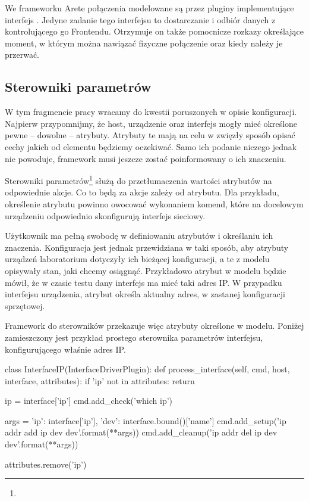 \documentclass[00-praca-magisterska.tex]{subfiles}
\begin{document}
We frameworku Arete połączenia modelowane są przez pluginy implementujące
interfejs . Jedyne zadanie tego interfejsu to
dostarczanie i odbiór danych z kontrolującego go Frontendu. Otrzymuje on także
pomocnicze rozkazy określające moment, w którym można nawiązać fizyczne
połączenie oraz kiedy należy je przerwać.


\subsection{Sterowniki parametrów}

W tym fragmencie pracy wracamy do kwestii poruszonych w opisie konfiguracji.
Najpierw przypomnijmy, że host, urządzenie oraz interfejs mogły mieć określone
pewne -- dowolne -- atrybuty. Atrybuty te mają na celu w zwięzły sposób opisać
cechy jakich od elementu będziemy oczekiwać. Samo ich podanie niczego jednak nie
powoduje, framework musi jeszcze zostać poinformowany o ich znaczeniu.

Sterowniki parametrów\footnote{} służą do przetłumaczenia
wartości atrybutów na odpowiednie akcje. Co to będą za akcje zależy od atrybutu.
Dla przykładu, określenie atrybutu  powinno owocować wykonaniem komend,
które na docelowym urządzeniu odpowiednio skonfigurują interfejs sieciowy.

Użytkownik ma pełną swobodę w definiowaniu atrybutów i określaniu ich
znaczenia. Konfiguracja jest jednak przewidziana w taki sposób, aby atrybuty
urządzeń laboratorium dotyczyły ich bieżącej konfiguracji, a te z modelu
opisywały stan, jaki chcemy osiągnąć. Przykładowo atrybut  w modelu
będzie mówił, że w czasie testu dany interfejs ma mieć taki adres IP. W
przypadku interfejsu urządzenia, atrybut  określa aktualny adres, w
zastanej konfiguracji sprzętowej.

Framework do sterowników przekazuje więc atrybuty określone w modelu. Poniżej
zamieszczony jest przykład prostego sterownika parametrów interfejsu,
konfigurującego właśnie adres IP.

\begin{pythoncode}
  class InterfaceIP(InterfaceDriverPlugin):
      def process_interface(self, cmd, host, interface, attributes):
          if 'ip' not in attributes:
              return
  
          ip = interface['ip']
          cmd.add_check('which ip')
  
          args = {'ip': interface['ip'],
                  'dev': interface.bound()['name']}
          cmd.add_setup('ip addr add {ip} dev {dev}'.format(**args))
          cmd.add_cleanup('ip addr del {ip} dev {dev}'.format(**args))
  
          attributes.remove('ip')

\end{pythoncode}
\end{document}
